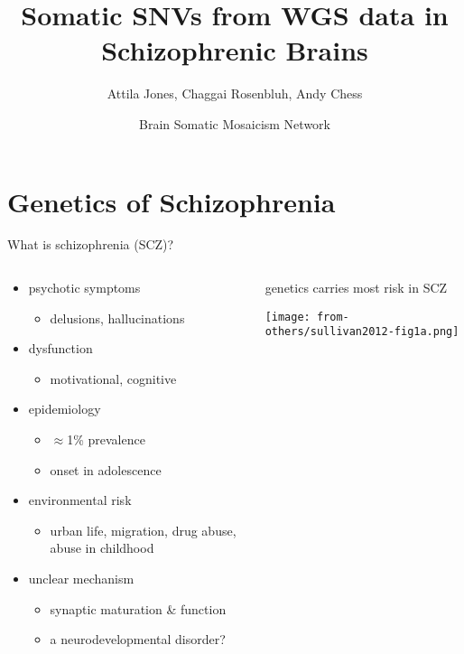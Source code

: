 \documentclass[usenames,dvipsnames]{beamer}
\title{Somatic SNVs from WGS data in Schizophrenic Brains}
\author{Attila Jones, Chaggai Rosenbluh, Andy Chess}
\date{Brain Somatic Mosaicism Network}
\begin{document}
\maketitle

\section{Genetics of Schizophrenia}

\begin{frame}{What is schizophrenia (SCZ)?}
\begin{columns}[t]
\begin{column}{0.55\textwidth}
	\begin{itemize}
                \item psychotic symptoms
			\begin{itemize}
				\item delusions, hallucinations
			\end{itemize}
                \item dysfunction
			\begin{itemize}
				\item motivational, cognitive
			\end{itemize}
                \item epidemiology
			\begin{itemize}
				\item \(\approx\)1\% prevalence
				\item onset in adolescence
			\end{itemize}
                \item environmental risk
			\begin{itemize}
				\item urban life, migration, drug abuse,
					abuse in childhood
			\end{itemize}
                \item unclear mechanism
			\begin{itemize}
				\item synaptic maturation \& 
					function
                                \item a neurodevelopmental disorder?
			\end{itemize}
	\end{itemize}
\end{column}

\begin{column}{0.45\textwidth}
	genetics carries most risk in SCZ

\texttt{[image: from-others/sullivan2012-fig1a.png]}
\end{column}
\end{columns}
\end{frame}
\end{document}
